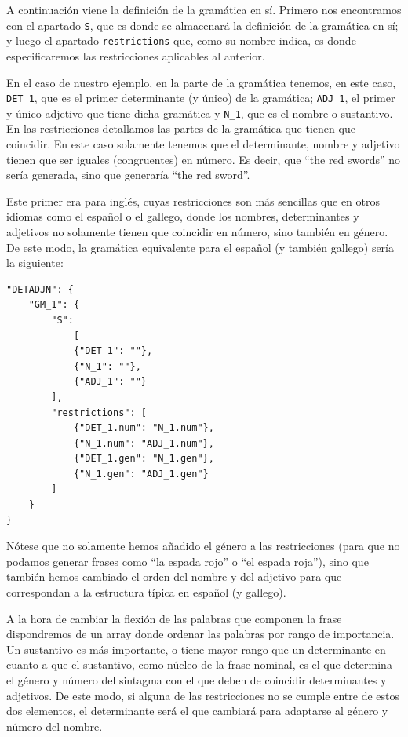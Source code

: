 A continuación viene la definición de la gramática en sí. Primero nos encontramos con el apartado \texttt{S}, que es donde se almacenará la definición de la gramática en sí; y luego el apartado \texttt{restrictions} que, como su nombre indica, es donde especificaremos las restricciones aplicables al anterior.

En el caso de nuestro ejemplo, en la parte de la gramática tenemos, en este caso, \texttt{DET\_1}, que es el primer determinante (y único) de la gramática; \texttt{ADJ\_1}, el primer y único adjetivo que tiene dicha gramática y \texttt{N\_1}, que es el nombre o sustantivo.
En las restricciones detallamos las partes de la gramática que tienen que coincidir. En este caso solamente tenemos que el determinante, nombre y adjetivo tienen que ser iguales (congruentes) en número. Es decir, que ``the red swords'' no sería generada, sino que generaría ``the red sword''.

Este primer era para inglés, cuyas restricciones son más sencillas que en otros idiomas como el español o el gallego, donde los nombres, determinantes y adjetivos no solamente tienen que coincidir en número, sino también en género. De este modo, la gramática equivalente para el español (y también gallego) sería la siguiente:

\begin{lstlisting}[style=json]
"DETADJN": {
    "GM_1": {
        "S": 
            [
            {"DET_1": ""},
            {"N_1": ""},
            {"ADJ_1": ""}
        ],
        "restrictions": [
            {"DET_1.num": "N_1.num"},
            {"N_1.num": "ADJ_1.num"},
            {"DET_1.gen": "N_1.gen"},
            {"N_1.gen": "ADJ_1.gen"}
        ]
    }
}
\end{lstlisting}

\noindent Nótese que no solamente hemos añadido el género a las restricciones (para que no podamos generar frases como ``la espada rojo'' o ``el espada roja''), sino que también hemos cambiado el orden del nombre y del adjetivo para que correspondan a la estructura típica en español (y gallego). 

A la hora de cambiar la flexión de las palabras que componen la frase dispondremos de un array donde ordenar las palabras por rango de importancia. Un sustantivo es más importante, o tiene mayor rango que un determinante en cuanto a que el sustantivo, como núcleo de la frase nominal, es el que determina el género y número del sintagma con el que deben de coincidir determinantes y adjetivos. De este modo, si alguna de las restricciones no se cumple entre de estos dos elementos, el determinante será el que cambiará para adaptarse al género y número del nombre.


